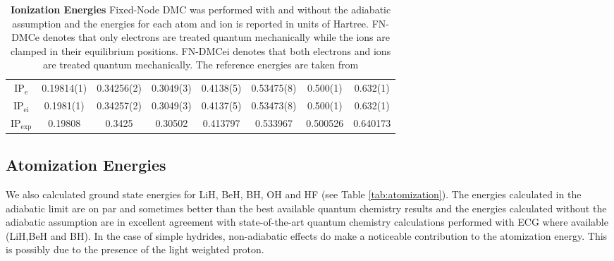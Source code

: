 \documentclass[aps,prl,superscriptaddress,groupedaddress]{revtex4}
\begin{document}
\begin{table*}[htpb!]
\begin{tabular}{*{1}{*{8}{c}}}
\hline
$\text{IP}_{\text{e}}$  & 0.19814(1) & 0.34256(2) & 0.3049(3) & 0.4138(5) & 0.53475(8) & 0.500(1) & 0.632(1) \\
$\text{IP}_{\text{ei}}$ & 0.1981(1) & 0.34257(2) & 0.3049(3) & 0.4137(5) & 0.53473(8) & 0.500(1) & 0.632(1) \\
$\text{IP}_{\text{exp}}$ & 0.19808 & 0.3425 & 0.30502 & 0.413797 & 0.533967 & 0.500526 & 0.640173 \\
\hline
\end{tabular}
\caption{\textbf{Ionization Energies} Fixed-Node DMC was performed with and without the adiabatic assumption and the energies for each atom and ion is reported in units of Hartree. FN-DMCe denotes that only electrons are treated quantum mechanically while the ions are clamped in their equilibrium positions. FN-DMCei denotes that both electrons and ions are treated quantum mechanically. The reference energies are taken from \cite{Seth_Bench} \label{tab:ionization}}
\end{table*}
 
\subsection{Atomization Energies}
We also calculated ground state energies for LiH, BeH, BH, OH and HF (see Table \ref{tab:atomization}). The energies calculated in the adiabatic limit are on par and sometimes better than the best available quantum chemistry results \cite{Adamowicz_LiH,Koput_BeH,Miliordos_BH} and the energies calculated without the adiabatic assumption are in excellent agreement with state-of-the-art quantum chemistry calculations performed with ECG where available (LiH,BeH and BH). In the case of simple hydrides, non-adiabatic effects do make a noticeable contribution to the atomization energy. This is possibly due to the presence of the light weighted proton.
 
\end{document}
